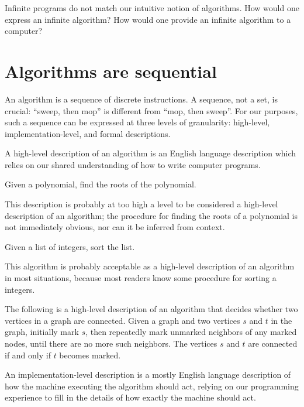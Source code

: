 Infinite programs do not match our intuitive notion of algorithms.
How would one express an infinite algorithm?
How would one provide an infinite algorithm to a computer?

\section{Algorithms are sequential}

An algorithm is a sequence of discrete instructions.
A sequence, not a set, is crucial: ``sweep, then mop'' is different from ``mop, then sweep''.
For our purposes, such a sequence can be expressed at three levels of granularity: high-level, implementation-level, and formal descriptions.

A high-level description of an algorithm is an English language description which relies on our shared understanding of how to write computer programs.

\begin{example}
  Given a polynomial, find the roots of the polynomial.

  This description is probably at too high a level to be considered a high-level description of an algorithm; the procedure for finding the roots of a polynomial is not immediately obvious, nor can it be inferred from context.
\end{example}

\begin{example}
  Given a list of integers, sort the list.

  This algorithm is probably acceptable as a high-level description of an algorithm in most situations, because most readers know some procedure for sorting a integers.
\end{example}

\begin{example}
  The following is a high-level description of an algorithm that decides whether two vertices in a graph are connected.
  Given a graph and two vertices $s$ and $t$ in the graph, initially mark $s$, then repeatedly mark unmarked neighbors of any marked nodes, until there are no more such neighbors.
  The vertices $s$ and $t$ are connected if and only if $t$ becomes marked.
\end{example}

An implementation-level description is a mostly English language description of how the machine executing the algorithm should act, relying on our programming experience to fill in the details of how exactly the machine should act.

